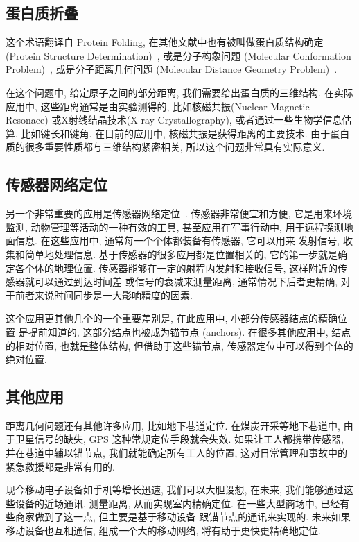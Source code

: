 \documentclass{CASthesis_zzk}
\begin{document}
\subsection{蛋白质折叠} 
这个术语翻译自 Protein Folding, 
在其他文献中也有被叫做蛋白质结构确定 (Protein Structure Determination)~\cite{Braun1987,Sit2011,Voller2013}, 
或是分子构象问题 (Molecular Conformation Problem)~\cite{Crippen1988,Biswas2008,Fang2013}, 
或是分子距离几何问题 (Molecular Distance Geometry Problem)~\cite{Dong2002,Dong2003,Carvalho2008}.

在这个问题中, 给定原子之间的部分距离, 我们需要给出蛋白质的三维结构.
在实际应用中, 这些距离通常是由实验测得的, 比如核磁共振(Nuclear Magnetic Resonace)
或X射线结晶技术(X-ray Crystallography), 或者通过一些生物学信息估算, 比如键长和键角.
在目前的应用中, 核磁共振是获得距离的主要技术.
由于蛋白质的很多重要性质都与三维结构紧密相关, 
所以这个问题非常具有实际意义.
    
\subsection{传感器网络定位} 
另一个非常重要的应用是传感器网络定位~\cite{Akyildiz2002,Chong2003,Mao2007,Yick2008}.
传感器非常便宜和方便, 它是用来环境监测, 动物管理等活动的一种有效的工具, 
甚至应用在军事行动中, 用于远程探测地面信息.
在这些应用中, 通常每一个个体都装备有传感器, 它可以用来
发射信号, 收集和简单地处理信息.
基于传感器的很多应用都是位置相关的, 它的第一步就是确定各个体的地理位置.
传感器能够在一定的射程内发射和接收信号, 这样附近的传感器就可以通过到达时间差
或信号的衰减来测量距离, 通常情况下后者更精确, 
对于前者来说时间同步是一大影响精度的因素.

这个应用更其他几个的一个重要差别是, 在此应用中, 小部分传感器结点的精确位置
是提前知道的, 这部分结点也被成为锚节点 (anchors).
在很多其他应用中, 结点的相对位置, 也就是整体结构,
但借助于这些锚节点, 传感器定位中可以得到个体的绝对位置.
 
\subsection{其他应用}
距离几何问题还有其他许多应用, 比如地下巷道定位.
在煤炭开采等地下巷道中, 由于卫星信号的缺失, GPS 这种常规定位手段就会失效.
如果让工人都携带传感器, 并在巷道中辅以锚节点, 
我们就能确定所有工人的位置, 这对日常管理和事故中的紧急救援都是非常有用的.

现今移动电子设备如手机等增长迅速, 我们可以大胆设想, 
在未来, 我们能够通过这些设备的近场通讯, 测量距离, 从而实现室内精确定位.
在一些大型商场中, 已经有些商家做到了这一点, 但主要是基于移动设备
跟锚节点的通讯来实现的. 未来如果移动设备也互相通信,
组成一个大的移动网络, 将有助于更快更精确地定位.
\end{document}
